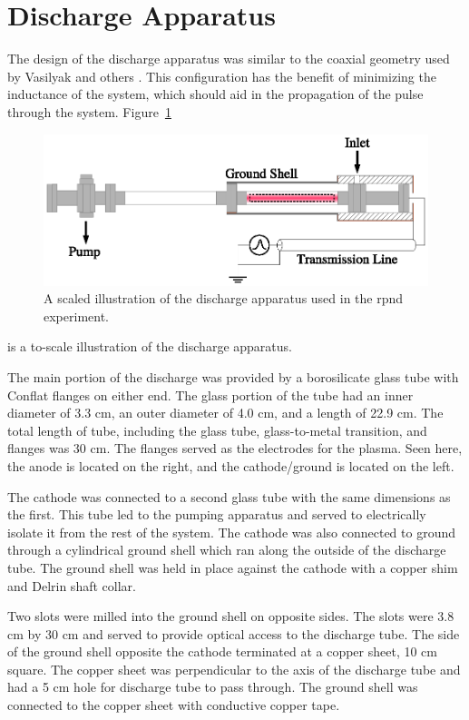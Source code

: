 \section{Discharge Apparatus}

The design of the discharge apparatus was similar to the coaxial geometry used
by Vasilyak and others \cite{Vasilyak1994}. This configuration has the benefit
of minimizing the inductance of the system, which should aid in the propagation
of the pulse through the system. Figure~\ref{fig:appschem}
\begin{figure}
  \centering
  \includegraphics{./chapters/experiment/figures/appschem.eps}
  \caption{A scaled illustration of the discharge apparatus used in the
  \acs{rpnd} experiment.}
  \label{fig:appschem}
\end{figure}
is a to-scale illustration of the discharge apparatus.

The main portion of the discharge was provided by a borosilicate glass tube with
Conflat flanges on either end. The glass portion of the tube had an inner
diameter of 3.3 cm, an outer diameter of 4.0 cm, and a length of 22.9 cm. The
total length of tube, including the glass tube, glass-to-metal transition, and
flanges was 30 cm. The flanges served as the electrodes for the plasma. Seen
here, the anode is located on the right, and the cathode/ground is located on
the left.

The cathode was connected to a second glass tube with the same dimensions as the
first. This tube led to the pumping apparatus and served to electrically isolate
it from the rest of the system. The cathode was also connected to ground through
a cylindrical ground shell which ran along the outside of the discharge tube.
The ground shell was held in place against the cathode with a copper shim and
Delrin shaft collar.

Two slots were milled into the ground shell on opposite sides. The slots were
3.8 cm by 30 cm and served to provide optical access to the discharge tube. The
side of the ground shell opposite the cathode terminated at a copper sheet, 10
cm square. The copper sheet was perpendicular to the axis of the discharge tube
and had a 5 cm hole for discharge tube to pass through. The ground shell was
connected to the copper sheet with conductive copper tape.

